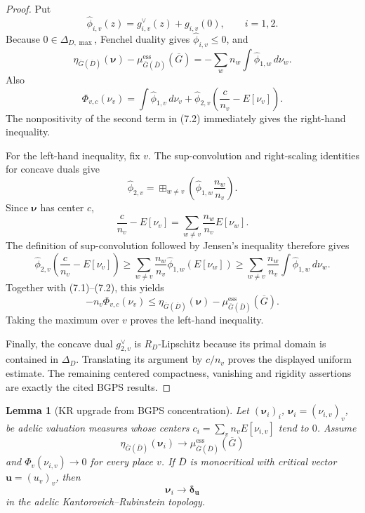 \documentclass[10pt,a4paper]{amsart}
\theoremstyle{plain}
\newtheorem{lemma}[theorem]{Lemma}
\theoremstyle{plain}
\numberwithin{equation}{section}
\providecommand{\bD}{\overline{D}}
\providecommand{\muess}{\mu^{\mathrm{ess}}}
\begin{document}
\begin{proof}
	Put
	\[
	\widehat\phi_{i,v}(z)=g_{i,v}^{\vee}(z)+g_{i,v}(0),
	\qquad i=1,2.
	\]
	Because \(0\in\Delta_{D,\max}\), Fenchel duality gives
	\(\widehat\phi_{i,v}\le0\), and
	\[
	\eta_{\overline G(\bD)}(\boldsymbol\nu)
	-\muess_{\overline G(\bD)}(\overline G)
	=-\sum_w n_w\int\widehat\phi_{1,w}\,d\nu_w.                 \tag{7.1}
	\]
	Also
	\[
	\Phi_{v,c}(\nu_v)
	=\int\widehat\phi_{1,v}\,d\nu_v
	+\widehat\phi_{2,v}\!\left(\frac{c}{n_v}-E[\nu_v]\right).
	\tag{7.2}
	\]
	The nonpositivity of the second term in (7.2) immediately gives the right-hand
	inequality.
	
	For the left-hand inequality, fix \(v\).  The sup-convolution and right-scaling
	identities for concave duals
	\cite[Propositions 2.3.1(1) and 2.3.3(3)]{BPS14} give
	\[
	\widehat\phi_{2,v}
	=\boxplus_{w\ne v}
	\left(\widehat\phi_{1,w}\frac{n_w}{n_v}\right).
	\]
	Since \(\boldsymbol\nu\) has center \(c\),
	\[
	\frac{c}{n_v}-E[\nu_v]
	=\sum_{w\ne v}\frac{n_w}{n_v}E[\nu_w].
	\]
	The definition of sup-convolution followed by Jensen's inequality therefore
	gives
	\[
	\widehat\phi_{2,v}\!\left(\frac{c}{n_v}-E[\nu_v]\right)
	\ge
	\sum_{w\ne v}\frac{n_w}{n_v}\widehat\phi_{1,w}(E[\nu_w])
	\ge
	\sum_{w\ne v}\frac{n_w}{n_v}
	\int\widehat\phi_{1,w}\,d\nu_w.
	\]
	Together with (7.1)--(7.2), this yields
	\[
	-n_v\Phi_{v,c}(\nu_v)
	\le
	\eta_{\overline G(\bD)}(\boldsymbol\nu)
	-\muess_{\overline G(\bD)}(\overline G).
	\]
	Taking the maximum over \(v\) proves the left-hand inequality.
	
	Finally, the concave dual \(g_{2,v}^{\vee}\) is \(R_D\)-Lipschitz because its
	primal domain is contained in \(\Delta_D\).  Translating its argument by
	\(c/n_v\) proves the displayed uniform estimate.  The remaining centered
	compactness, vanishing and rigidity assertions are exactly the cited BGPS
	results.
\end{proof}

\begin{lemma}[KR upgrade from BGPS concentration]
	\label{lem:bgps-kr-upgrade}
	Let \((\boldsymbol\nu_i)_i\), \(\boldsymbol\nu_i=(\nu_{i,v})_v\), be adelic
	valuation measures whose centers \(c_i=\sum_v n_vE[\nu_{i,v}]\) tend to \(0\).
	Assume
	\[
	\eta_{\overline G(\bD)}(\boldsymbol\nu_i)
	\longrightarrow
	\muess_{\overline G(\bD)}(\overline G)
	\]
	and \(\Phi_v(\nu_{i,v})\to0\) for every place \(v\).  If \(\bD\) is
	monocritical with critical vector \(\mathbf u=(u_v)_v\), then
	\[
	\boldsymbol\nu_i\longrightarrow\boldsymbol\delta_{\mathbf u}
	\]
	in the adelic Kantorovich--Rubinstein topology.
\end{lemma}
\end{document}

